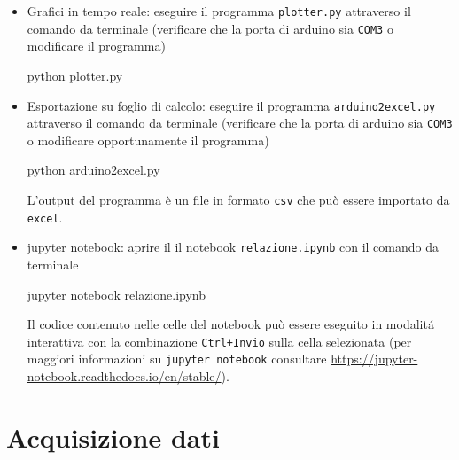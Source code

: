 \documentclass[11pt]{article}
\newenvironment{Shaded}{}{}
\newcommand{\NormalTok}[1]{{#1}}
\newcommand{\ExtensionTok}[1]{{#1}}
\begin{document}
\begin{itemize}
\item Grafici in tempo reale: eseguire il programma \texttt{plotter.py} attraverso il
comando da terminale (verificare che la porta di arduino sia
\texttt{COM3} o modificare il programma)

\begin{Shaded}
\begin{Highlighting}[]
\ExtensionTok{python}\NormalTok{ plotter.py}
\end{Highlighting}
\end{Shaded}

\item
  Esportazione su foglio di calcolo: eseguire il programma
  \texttt{arduino2excel.py} attraverso il comando da terminale
  (verificare che la porta di arduino sia \texttt{COM3} o modificare opportunamente il
  programma)

\begin{Shaded}
\begin{Highlighting}[]
\ExtensionTok{python}\NormalTok{ arduino2excel.py}
\end{Highlighting}
\end{Shaded}

  L'output del programma è un file in formato \texttt{csv} che può essere importato da \texttt{excel}.

\item
  \href{https://jupyter.org/}{jupyter} notebook: aprire il il notebook \texttt{relazione.ipynb} con il comando da terminale

\begin{Shaded}
\begin{Highlighting}[]
\ExtensionTok{jupyter}\NormalTok{ notebook relazione.ipynb}
\end{Highlighting}
\end{Shaded}

Il codice contenuto nelle celle del notebook può essere eseguito in modalit\'a interattiva
con la combinazione \texttt{Ctrl+Invio} sulla cella selezionata
(per maggiori informazioni su \texttt{jupyter notebook} consultare \url{https://jupyter-notebook.readthedocs.io/en/stable/}).
\end{itemize}

    \hypertarget{acquisizione-dati}{%
\section{Acquisizione dati}\label{acquisizione-dati}}
\end{document}
